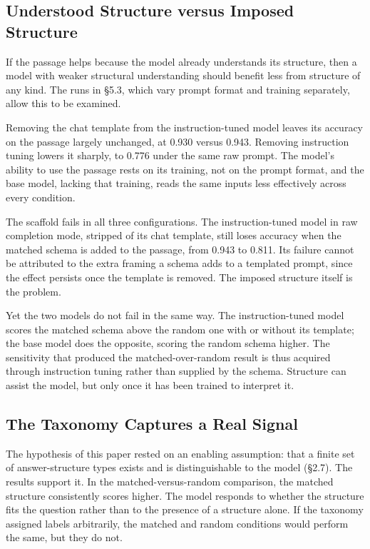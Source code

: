 \documentclass{article}
\begin{document}
\subsection{Understood Structure versus Imposed Structure}

If the passage helps because the model already understands its structure, then a model with weaker structural understanding should benefit less from structure of any kind. The runs in \S5.3, which vary prompt format and training separately, allow this to be examined.

Removing the chat template from the instruction-tuned model leaves its accuracy on the passage largely unchanged, at 0.930 versus 0.943. Removing instruction tuning lowers it sharply, to 0.776 under the same raw prompt. The model's ability to use the passage rests on its training, not on the prompt format, and the base model, lacking that training, reads the same inputs less effectively across every condition.

The scaffold fails in all three configurations. The instruction-tuned model in raw completion mode, stripped of its chat template, still loses accuracy when the matched schema is added to the passage, from 0.943 to 0.811. Its failure cannot be attributed to the extra framing a schema adds to a templated prompt, since the effect persists once the template is removed. The imposed structure itself is the problem.

Yet the two models do not fail in the same way. The instruction-tuned model scores the matched schema above the random one with or without its template; the base model does the opposite, scoring the random schema higher. The sensitivity that produced the matched-over-random result is thus acquired through instruction tuning rather than supplied by the schema. Structure can assist the model, but only once it has been trained to interpret it.

\subsection{The Taxonomy Captures a Real Signal}

The hypothesis of this paper rested on an enabling assumption: that a finite set of answer-structure types exists and is distinguishable to the model (\S2.7). The results support it. In the matched-versus-random comparison, the matched structure consistently scores higher. The model responds to whether the structure fits the question rather than to the presence of a structure alone. If the taxonomy assigned labels arbitrarily, the matched and random conditions would perform the same, but they do not.
\end{document}
